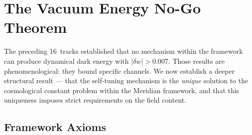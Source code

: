 


\section{The Vacuum Energy No-Go Theorem}
\label{sec:3-vacuum-nogo}

The preceding 16~tracks established that no mechanism within the framework can produce dynamical dark energy with $|\delta w| > 0.007$. Those results are phenomenological: they bound specific channels. We now establish a deeper structural result --- that the self-tuning mechanism is the \emph{unique} solution to the cosmological constant problem within the Meridian framework, and that this uniqueness imposes strict requirements on the field content.

\subsection{Framework Axioms}
\label{sec:3-vnogo-axioms}

